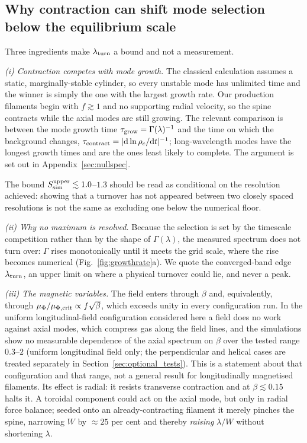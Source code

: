 \documentclass[usenatbib,twoside,twocolumn]{mnras}
\begin{document}
\subsection{Why contraction can shift mode selection below the equilibrium scale}
\label{sec:whyupper}

Three ingredients make $\lambda_{\rm turn}$ a bound  and not a measurement.

\emph{(i) Contraction competes with mode growth.} The classical calculation assumes a static, marginally-stable cylinder, so every unstable mode has unlimited time and the winner is simply the one with the largest growth rate. Our production filaments begin with $f\gtrsim1$ and no supporting radial velocity, so the spine contracts while the axial modes are still growing. The relevant comparison is between the mode growth time $\tau_{\rm grow}=\Gamma(\lambda)^{-1}$ and the time on which the background changes, $\tau_{\rm contract}=|{\rm d}\ln\rho_c/{\rm d}t|^{-1}$; long-wavelength modes have the longest growth times and are the ones least likely to complete. The argument is set out in Appendix~\ref{sec:nullspec}.

The bound $S_{\rm sim}^{\rm upper}\lesssim1.0$--$1.3$ should be read as conditional on the resolution achieved: showing that a turnover has not appeared between two closely spaced resolutions is not the same as excluding one below the numerical floor.

\emph{(ii) Why no maximum is resolved.} Because the selection is set by the timescale competition rather than by the shape of $\Gamma(\lambda)$, the measured spectrum does not turn over: $\Gamma$ rises monotonically until it meets the grid scale, where the rise becomes numerical (Fig.~\ref{fig:growthrate}a). We quote the converged-band edge $\lambda_{\rm turn}$, an upper limit on where a physical turnover could lie, and never a peak.

\emph{(iii) The magnetic variables.} The field enters through $\beta$ and, equivalently, through $\mu_\Phi/\mu_{\Phi,\rm crit}\propto f\sqrt{\beta}$, which exceeds unity in every configuration run. In the uniform longitudinal-field configuration considered here a field does no work against axial modes, which compress gas along the field lines, and the simulations show no measurable dependence of the axial spectrum on $\beta$ over the tested range $0.3$--$2$ (uniform longitudinal field only; the perpendicular and helical cases are treated separately in Section~\ref{sec:optional_tests}). This is a statement about that configuration and that range, not a general result for longitudinally magnetised filaments. Its effect is radial: it resists transverse contraction and at $\beta\lesssim0.15$ halts it. A toroidal component could act on the axial mode, but only in radial force balance; seeded onto an already-contracting filament it merely pinches the spine, narrowing $W$ by $\approx25$ per cent and thereby \emph{raising} $\lambda/W$ without shortening $\lambda$.
\end{document}
